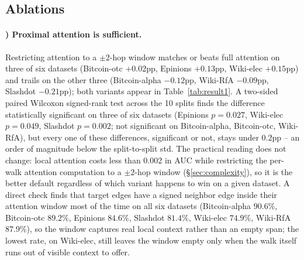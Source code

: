 \documentclass[sigconf, review, anonymous]{acmart}
\newcounter{ablation}
\renewcommand{\theablation}{\Alph{ablation}}
\theoremstyle{plain}
\theoremstyle{definition}
\begin{document}
\subsection{Ablations}

\paragraph{\theablation) Proximal attention is sufficient.}
\label{abl:proximal}
Restricting attention to a $\pm2$-hop window matches or beats full attention on three of six datasets (Bitcoin-otc $+0.02$pp, Epinions $+0.13$pp, Wiki-elec $+0.15$pp) and trails on the other three (Bitcoin-alpha $-0.12$pp, Wiki-RfA $-0.09$pp, Slashdot $-0.21$pp); both variants appear in Table~\ref{tab:result1}. A two-sided paired Wilcoxon signed-rank test across the 10 splits finds the difference statistically significant on three of six datasets (Epinions $p=0.027$, Wiki-elec $p=0.049$, Slashdot $p=0.002$; not significant on Bitcoin-alpha, Bitcoin-otc, Wiki-RfA), but every one of these differences, significant or not, stays under $0.2$pp -- an order of magnitude below the split-to-split std. The practical reading does not change: local attention costs less than 0.002 in AUC while restricting the per-walk attention computation to a $\pm2$-hop window (\S\ref{sec:complexity}), so it is the better default regardless of which variant happens to win on a given dataset. A direct check finds that target edges have a signed neighbor edge inside their attention window most of the time on all six datasets (Bitcoin-alpha $90.6\%$, Bitcoin-otc $89.2\%$, Epinions $84.6\%$, Slashdot $81.4\%$, Wiki-elec $74.9\%$, Wiki-RfA $87.9\%$), so the window captures real local context rather than an empty span; the lowest rate, on Wiki-elec, still leaves the window empty only when the walk itself runs out of visible context to offer.
\end{document}
